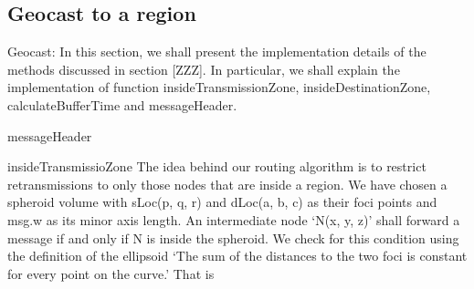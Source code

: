 \subsection{Geocast to a region}


Geocast:
In this section, we shall present the implementation details of the methods discussed in section [ZZZ]. In particular, we shall explain the implementation of function insideTransmissionZone, insideDestinationZone, calculateBufferTime and messageHeader.

messageHeader

insideTransmissioZone
The idea behind our routing algorithm is to restrict retransmissions to only those nodes that are inside a region. We have chosen a spheroid volume with sLoc(p, q, r) and dLoc(a, b, c) as their foci points and msg.w as its minor axis length. An intermediate node `N(x, y, z)’ shall forward a message if and only if N is inside the spheroid. We check for this condition using the definition of the ellipsoid `The sum of the distances to the two foci is constant for every point on the curve.’
That is

